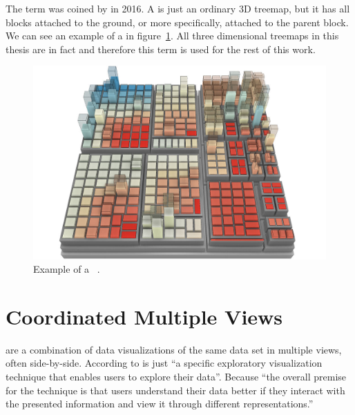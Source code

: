 The term \tmap{} was coined by \textcite{Limberger2016} in 2016.
A \tmap{} is just an ordinary 3D treemap, but it has all blocks attached to the ground, or more specifically, attached to the parent block.
We can see an example of a \tmap{} in figure~\ref{fig:research:ua_treemap}.
All three dimensional treemaps in this thesis are in fact \tmaps{} and therefore this term is used for the rest of this work.

\begin{figure}[ht]
  \centering
  \includegraphics[width=\textwidth]{figures/related-work/2_5D_treemap_example}
  \caption{Example of a \tmap{}~\parencite{Doellner2017}.}
  \label{fig:research:ua_treemap}
\end{figure}


\section{Coordinated Multiple Views}\label{sec:related-work:cmvs}
\cmvs{} are a combination of data visualizations of the same data set in multiple views, often side-by-side.
According to \textcite{Roberts2007} \cmvs{} is just ``a specific exploratory visualization technique that enables users to explore their data''.
Because ``the overall premise for the technique is that users understand their data better if they interact with the presented information and view it through different representations.''~\parencite{Roberts2007}

